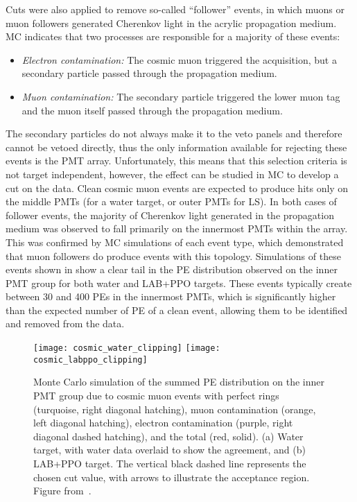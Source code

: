 Cuts were also applied to remove so-called ``follower'' events, in which muons or muon followers generated Cherenkov light in the acrylic propagation medium.
MC indicates that two processes are responsible for a majority of these events: 
\begin{itemize}
\item \emph{Electron contamination:} The cosmic muon triggered the acquisition, but a secondary particle passed through the propagation medium.
\item \emph{Muon contamination:} The secondary particle triggered the lower muon tag and the muon itself passed through the propagation medium.  
\end{itemize}
The secondary particles do not always make it to the veto panels and therefore cannot be vetoed directly, thus the only information available for rejecting these events is the PMT array.  
Unfortunately, this means that this selection criteria is not target independent, however, the effect can be studied in MC to develop a cut on the data.
Clean cosmic muon events are expected to produce hits only on the middle PMTs (for a water target, or outer PMTs for LS).
In both cases of follower events, the majority of Cherenkov light generated in the propagation medium was observed to fall primarily on the innermost PMTs within the array.  
This was confirmed by MC simulations of each event type, which demonstrated that muon followers do produce events with this topology.   
Simulations of these events shown in  show a clear tail in the PE distribution observed on the inner PMT group for both water and LAB+PPO targets.
These events typically create between 30 and 400 PEs in the innermost PMTs, which is significantly higher than the expected number of PE of a clean event, allowing them to be identified and removed from the data.

\begin{figure}
\centering
\texttt{[image: cosmic\_water\_clipping]}
\texttt{[image: cosmic\_labppo\_clipping]}
\caption{ Monte Carlo simulation of the summed PE distribution on the inner PMT group due to cosmic muon events with perfect rings (turquoise, right diagonal hatching), muon contamination (orange, left diagonal hatching), electron contamination (purple, right diagonal dashed hatching), and the total (red, solid).  (a) Water target, with water data overlaid to show the agreement, and (b) LAB+PPO target.  The vertical black dashed line represents the chosen cut value, with arrows to illustrate the acceptance region. Figure from~\cite{chess_nim}.}
\label{f:clipMC}
\end{figure}


